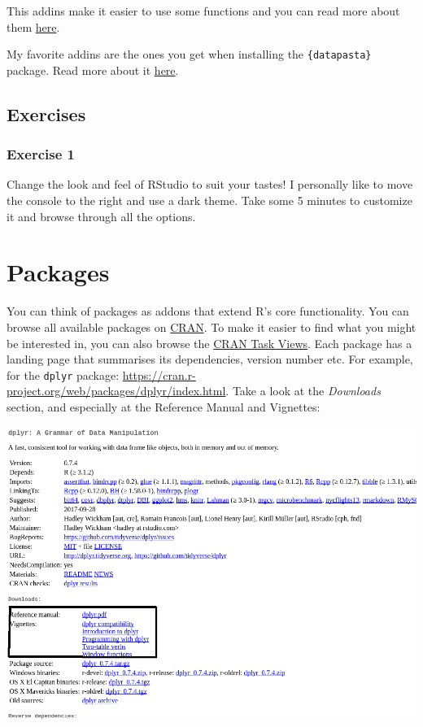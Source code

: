 \documentclass[]{gitbook}
\theoremstyle{definition}
\theoremstyle{definition}
\theoremstyle{definition}
\theoremstyle{remark}
\begin{document}
This addins make it easier to use some functions and you can read more
about them
\href{https://rstudio.github.io/rstudioaddins/\#overview}{here}.

My favorite addins are the ones you get when installing the
\texttt{\{datapasta\}} package. Read more about it
\href{https://github.com/MilesMcBain/datapasta}{here}.

\hypertarget{exercises}{%
\subsection{Exercises}\label{exercises}}

\hypertarget{exercise-1}{%
\subsubsection*{Exercise 1}\label{exercise-1}}

Change the look and feel of RStudio to suit your tastes! I personally
like to move the console to the right and use a dark theme. Take some 5
minutes to customize it and browse through all the options.

\hypertarget{packages}{%
\section{Packages}\label{packages}}

You can think of packages as addons that extend R's core functionality.
You can browse all available packages on
\href{https://cloud.r-project.org/}{CRAN}. To make it easier to find
what you might be interested in, you can also browse the
\href{https://cloud.r-project.org/web/views/}{CRAN Task Views}. Each
package has a landing page that summarises its dependencies, version
number etc. For example, for the \texttt{dplyr} package:
\url{https://cran.r-project.org/web/packages/dplyr/index.html}. Take a
look at the \emph{Downloads} section, and especially at the Reference
Manual and Vignettes:

\includegraphics[width=13.49in]{pics/packages_vignette}
\end{document}
